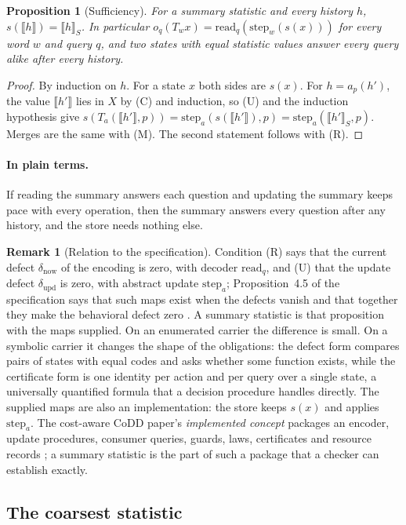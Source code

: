 \documentclass[11pt]{article}
\newcommand{\dnow}{\delta_{\mathrm{now}}}
\newcommand{\dupd}{\delta_{\mathrm{upd}}}
\newcommand{\step}{\mathrm{step}}
\newcommand{\rd}{\mathrm{read}}
\newcommand{\plain}{\paragraph{In plain terms.}}
\theoremstyle{definition}
\newtheorem{remark}[definition]{Remark}
\theoremstyle{plain}
\newtheorem{proposition}[definition]{Proposition}
\begin{document}
\begin{proposition}[Sufficiency]\label{prop:suff}
For a summary statistic and every history $h$, $s(\llbracket h\rrbracket)=\llbracket
h\rrbracket_S$. In particular $o_q(T_w x)=\rd_q(\step_w(s(x)))$ for every word $w$ and query $q$,
and two states with equal statistic values answer every query alike after every history.
\end{proposition}

\begin{proof}
By induction on $h$. For a state $x$ both sides are $s(x)$. For $h=a_p(h')$, the value
$\llbracket h'\rrbracket$ lies in $X$ by (C) and induction, so (U) and the induction hypothesis
give $s(T_a(\llbracket h'\rrbracket,p))=\step_a(s(\llbracket h'\rrbracket),p)=\step_a(\llbracket
h'\rrbracket_S,p)$. Merges are the same with (M). The second statement follows with (R).
\end{proof}

\plain If reading the summary answers each question and updating the summary keeps pace with every
operation, then the summary answers every question after any history, and the store needs nothing
else.

\begin{remark}[Relation to the specification]\label{rem:descent}
Condition (R) says that the current defect $\dnow$ of the encoding is zero, with decoder $\rd_q$,
and (U) that the update defect $\dupd$ is zero, with abstract update $\step_a$; Proposition~4.5 of
the specification says that such maps exist when the defects vanish and that together they make the
behavioral defect zero \cite[Section~4.2]{spec}. A summary statistic is that proposition with the
maps supplied. On an enumerated carrier the difference is small. On a symbolic carrier it changes
the shape of the obligations: the defect form compares pairs of states with equal codes and asks
whether some function exists, while the certificate form is one identity per action and per query
over a single state, a universally quantified formula that a decision procedure handles directly.
The supplied maps are also an implementation: the store keeps $s(x)$ and applies $\step_a$. The
cost-aware CoDD paper's \emph{implemented concept} packages an encoder, update procedures,
consumer queries, guards, laws, certificates and resource records \cite[Definition~6.1]{codd}; a
summary statistic is the part of such a package that a checker can establish exactly.
\end{remark}

\subsection{The coarsest statistic}
\end{document}
